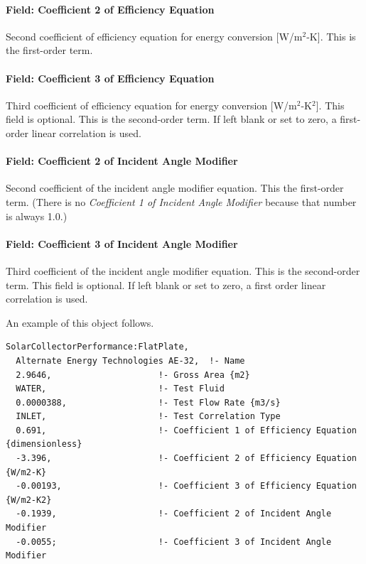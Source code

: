\paragraph{Field: Coefficient 2 of Efficiency Equation}\label{field-coefficient-2-of-efficiency-equation}

Second coefficient of efficiency equation for energy conversion {[}W/m\(^{2}\)-K{]}. This is the first-order term.

\paragraph{Field: Coefficient 3 of Efficiency Equation}\label{field-coefficient-3-of-efficiency-equation}

Third coefficient of efficiency equation for energy conversion {[}W/m\(^{2}\)-K\(^{2}\){]}. This field is optional. This is the second-order term. If left blank or set to zero, a first-order linear correlation is used.

\paragraph{Field: Coefficient 2 of Incident Angle Modifier}\label{field-coefficient-2-of-incident-angle-modifier}

Second coefficient of the incident angle modifier equation. This the first-order term. (There is no \emph{Coefficient 1 of Incident Angle Modifier} because that number is always 1.0.)

\paragraph{Field: Coefficient 3 of Incident Angle Modifier}\label{field-coefficient-3-of-incident-angle-modifier}

Third coefficient of the incident angle modifier equation. This is the second-order term. This field is optional. If left blank or set to zero, a first order linear correlation is used.

An example of this object follows.

\begin{lstlisting}
SolarCollectorPerformance:FlatPlate,
  Alternate Energy Technologies AE-32,  !- Name
  2.9646,                     !- Gross Area {m2}
  WATER,                      !- Test Fluid
  0.0000388,                  !- Test Flow Rate {m3/s}
  INLET,                      !- Test Correlation Type
  0.691,                      !- Coefficient 1 of Efficiency Equation {dimensionless}
  -3.396,                     !- Coefficient 2 of Efficiency Equation {W/m2-K}
  -0.00193,                   !- Coefficient 3 of Efficiency Equation {W/m2-K2}
  -0.1939,                    !- Coefficient 2 of Incident Angle Modifier
  -0.0055;                    !- Coefficient 3 of Incident Angle Modifier
\end{lstlisting}

